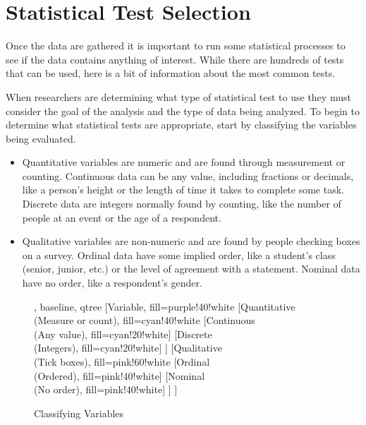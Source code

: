 \section{Statistical Test Selection}

Once the data are gathered it is important to run some statistical processes to see if the data contains anything of interest. While there are hundreds of tests that can be used, here is a bit of information about the most common tests.

When researchers are determining what type of statistical test to use they must consider the goal of the analysis and the type of data being analyzed. To begin to determine what statistical tests are appropriate, start by classifying the variables being evaluated. 

\begin{itemize}
	\item Quantitative variables are numeric and are found through measurement or counting. Continuous data can be any value, including fractions or decimals, like a person's height or the length of time it takes to complete some task. Discrete data are integers normally found by counting, like the number of people at an event or the age of a respondent.
	\item Qualitative variables are non-numeric and are found by people checking boxes on a survey. Ordinal data have some implied order, like a student's class (senior, junior, etc.) or the level of agreement with a statement. Nominal data have no order, like a respondent's gender.
\end{itemize}

\begin{figure}[H]
	\centering

		
	\begin{forest}, baseline, qtree
		[Variable, fill=purple!40!white
			[{Quantitative\\(Measure or count)}, fill=cyan!40!white
				[{Continuous\\(Any value)}, fill=cyan!20!white]
				[{Discrete\\(Integers)}, fill=cyan!20!white]
			]
			[{Qualitative\\(Tick boxes)}, fill=pink!60!white
				[{Ordinal\\(Ordered)}, fill=pink!40!white]
				[{Nominal\\(No order)}, fill=pink!40!white]
			]
		]
	\end{forest}

	\caption{Classifying Variables}
	\label{fig06.08}
\end{figure}

